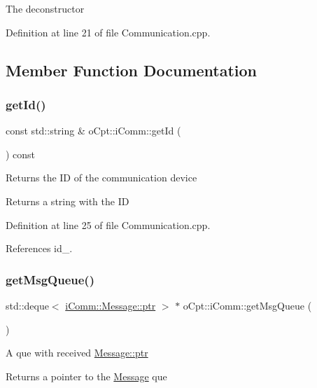 The deconstructor 

Definition at line 21 of file Communication.\+cpp.



\subsection{Member Function Documentation}
\hypertarget{classo_cpt_1_1i_comm_a4d7452118307e98a10c5aac88f69ca16}{}\label{classo_cpt_1_1i_comm_a4d7452118307e98a10c5aac88f69ca16} 
\subsubsection{\texorpdfstring{get\+Id()}{getId()}}
{\footnotesize\ttfamily const std\+::string \& o\+Cpt\+::i\+Comm\+::get\+Id (\begin{DoxyParamCaption}{ }\end{DoxyParamCaption}) const}

Returns the ID of the communication device \begin{DoxyReturn}{Returns}
a string with the ID 
\end{DoxyReturn}


Definition at line 25 of file Communication.\+cpp.



References id\+\_\+.

\hypertarget{classo_cpt_1_1i_comm_a6fdac5c5dad398d31adf177c900b8054}{}\label{classo_cpt_1_1i_comm_a6fdac5c5dad398d31adf177c900b8054} 
\subsubsection{\texorpdfstring{get\+Msg\+Queue()}{getMsgQueue()}}
{\footnotesize\ttfamily std\+::deque$<$ \hyperlink{structo_cpt_1_1i_comm_1_1_message_ad2ba828ad76f96a30e3898b2609a4c01}{i\+Comm\+::\+Message\+::ptr} $>$ $\ast$ o\+Cpt\+::i\+Comm\+::get\+Msg\+Queue (\begin{DoxyParamCaption}{ }\end{DoxyParamCaption})}

A que with received \hyperlink{structo_cpt_1_1i_comm_1_1_message_ad2ba828ad76f96a30e3898b2609a4c01}{Message\+::ptr} \begin{DoxyReturn}{Returns}
a pointer to the \hyperlink{structo_cpt_1_1i_comm_1_1_message}{Message} que 
\end{DoxyReturn}


